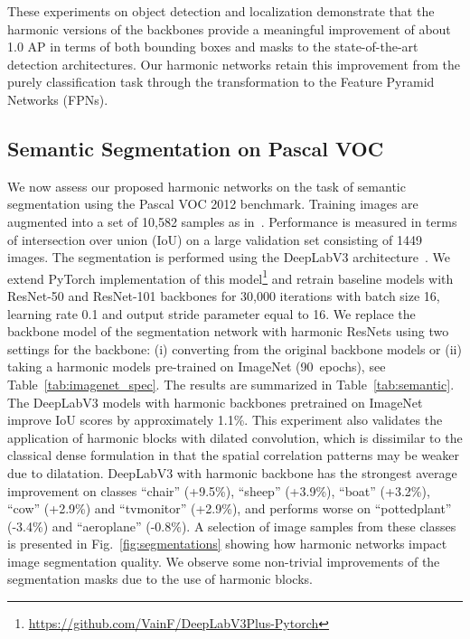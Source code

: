 \documentclass[12pt,a4paper]{article}
\begin{document}
These experiments on object detection and localization demonstrate that the harmonic versions of the backbones provide a meaningful improvement of about 1.0 AP in terms of both bounding boxes and masks to the state-of-the-art detection architectures. Our harmonic networks retain this improvement from the purely classification task through the transformation to the Feature Pyramid Networks (FPNs).

\subsection{Semantic Segmentation on Pascal VOC} \label{sec:experiments.semantic}

We now assess our proposed harmonic networks on the task of semantic segmentation using the Pascal VOC 2012 benchmark. Training images are augmented into a set of 10,582 samples as in~\cite{Chen17rethinking}. Performance is measured in terms of intersection over union (IoU) on a large validation set consisting of 1449 images. The segmentation is performed using the DeepLabV3 architecture~\cite{Chen17rethinking}. We extend  PyTorch implementation of this model\footnote{\url{https://github.com/VainF/DeepLabV3Plus-Pytorch}} and retrain baseline models with ResNet-50 and ResNet-101 backbones for 30,000 iterations with batch size 16, learning rate 0.1 and output stride parameter equal to 16.
We replace the backbone model of the segmentation network with harmonic ResNets using two settings for the backbone: (i) converting from the original backbone models or (ii) taking a harmonic models pre-trained on ImageNet (90~epochs), see Table~\ref{tab:imagenet_spec}. The results are summarized in Table~\ref{tab:semantic}. The DeepLabV3 models with harmonic backbones pretrained on ImageNet improve IoU scores by approximately 1.1\%. This experiment also validates the application of harmonic blocks with dilated convolution, which is dissimilar to the classical dense formulation in that the spatial correlation patterns may be weaker due to dilatation. 
DeepLabV3 with harmonic backbone has the strongest average improvement on classes ``chair'' (+9.5\%), ``sheep'' (+3.9\%), ``boat'' (+3.2\%), ``cow'' (+2.9\%) and ``tvmonitor'' (+2.9\%), and performs worse on ``pottedplant'' (-3.4\%) and ``aeroplane'' (-0.8\%). 
A selection of image samples from these classes is presented in Fig.~\ref{fig:segmentations} showing how harmonic networks impact image segmentation quality. We observe some non-trivial improvements of the segmentation masks due to the use of harmonic blocks.
\end{document}

